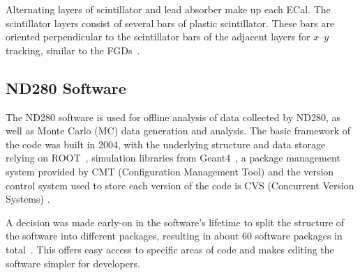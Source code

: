 \documentclass[aps,pra,12pt,notitlepage,tightenlines]{revtex4-1}
\begin{document}
Alternating layers of scintillator and lead absorber make up each ECal. The scintillator layers consist of several bars of plastic scintillator. These bars are oriented perpendicular to the scintillator bars of the adjacent layers for $x$--$y$ tracking, similar to the FGDs~\cite{ABE2011106, Allan:2013ofa}.

\subsection{ND280 Software}
The ND280 software is used for offline analysis of data collected by ND280, as well as Monte Carlo (MC) data generation and analysis. The basic framework of the code was built in 2004, with the underlying structure and data storage relying on ROOT~\cite{Brun1997}, simulation libraries from Geant4~\cite{Agostinelli2003}, a package management system provided by CMT (Configuration Management Tool) \cite{Arnault:2000vu} and the version control system used to store each version of the code is CVS (Concurrent Version Systems) \cite{Berliner2001}.

A decision was made early-on in the software's lifetime to split the structure of the software into different packages, resulting in about 60 software packages in total~\cite{ABE2011106}. This offers easy access to specific areas of code and makes editing the software simpler for developers. 
\end{document}
